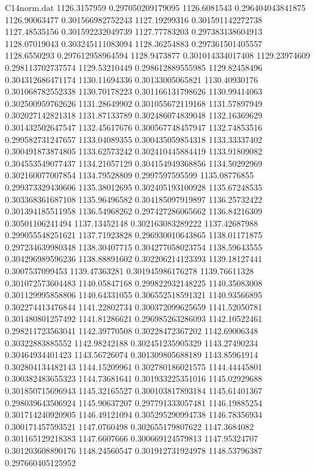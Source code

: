 \begin{filecontents}{C14norm.dat}
1126.3157959			0.297050209179095
1126.6081543			0.296404043841875
1126.90063477			0.301566982752243
1127.19299316			0.301591142272738
1127.48535156			0.301592232049739
1127.77783203			0.297383138604913
1128.07019043			0.303245111083094
1128.36254883			0.297361501405557
1128.6550293			0.297612958964594
1128.9473877			0.301014334017408
1129.23974609			0.298113702737574
1129.53210449			0.298612889555985
1129.82458496			0.304312686471174
1130.11694336			0.30133005065821
1130.40930176			0.301068782552338
1130.70178223			0.301166131798626
1130.99414063			0.302500959762626
1131.28649902			0.301055672119168
1131.57897949			0.302027142821318
1131.87133789			0.302486074839048
1132.16369629			0.301432502647547
1132.45617676			0.300567748457947
1132.74853516			0.299582731247657
1133.04089355			0.300435059854318
1133.33337402			0.300491873874805
1133.62573242			0.302410445884419
1133.91809082			0.304553549077437
1134.21057129			0.304154949368856
1134.50292969			0.302160077007854
1134.79528809			0.2997597595599
1135.08776855			0.299373329430606
1135.38012695			0.302405193100928
1135.67248535			0.303368361687108
1135.96496582			0.304185097919897
1136.25732422			0.301394185511958
1136.54968262			0.297427286065662
1136.84216309			0.30501106241494
1137.13452148			0.302163083289222
1137.42687988			0.299055548251621
1137.71923828			0.296930010643865
1138.01171875			0.297234639980348
1138.30407715			0.304277058023754
1138.59643555			0.304296989596236
1138.88891602			0.302206214123393
1139.18127441			0.3007537099453
1139.47363281			0.301945986176278
1139.76611328			0.301072573604483
1140.05847168			0.299822932148225
1140.35083008			0.301129995858806
1140.64331055			0.306552518591321
1140.93566895			0.302274413476844
1141.22802734			0.300372099625659
1141.52050781			0.301480801257492
1141.81286621			0.296985263286093
1142.10522461			0.298211723563041
1142.39770508			0.30228472367202
1142.69006348			0.30322883885552
1142.98242188			0.302451235905329
1143.27490234			0.30464934401423
1143.56726074			0.301309805688189
1143.85961914			0.302804134482143
1144.15209961			0.302780186021575
1144.44445801			0.300382483655323
1144.73681641			0.301933225351016
1145.02929688			0.301850715696943
1145.32165527			0.300103817893184
1145.61401367			0.298039643506924
1145.90637207			0.297791333057481
1146.19885254			0.301714240920905
1146.49121094			0.305295290994738
1146.78356934			0.300171457593521
1147.0760498			0.302655179807622
1147.3684082			0.301165129218383
1147.6607666			0.300669124579813
1147.95324707			0.301203608890176
1148.24560547			0.301912731924978
1148.53796387			0.297660405125952

\end{filecontents}
